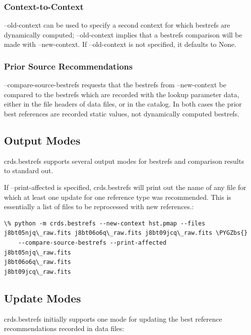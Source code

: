 \documentclass[letterpaper,10pt,english]{sphinxmanual}
\def\PYGZbs{\char`\\}
\begin{document}
\subsubsection{Context-to-Context}
\label{command_line_tools:context-to-context}
--old-context can be used to specify a second context for which bestrefs are dynamically computed; --old-context
implies that a bestrefs comparison will be made with --new-context.   If --old-context is not specified,  it
defaults to None.


\subsubsection{Prior Source Recommendations}
\label{command_line_tools:prior-source-recommendations}
--compare-source-bestrefs requests that the bestrefs from --new-context be compared to the bestrefs which are
recorded with the lookup parameter data,  either in the file headers of data files,  or in the catalog.   In both
cases the prior best references are recorded static values,  not dynamically computed bestrefs.


\subsection{Output Modes}
\label{command_line_tools:output-modes}
crds.bestrefs supports several output modes for bestrefs and comparison results to standard out.

If --print-affected is specified,  crds.bestrefs will print out the name of any file for which at least one update for
one reference type was recommended.   This is essentially a list of files to be reprocessed with new references.:

\begin{Verbatim}[commandchars=\\\{\}]
\% python -m crds.bestrefs --new-context hst.pmap --files j8bt05njq\_raw.fits j8bt06o6q\_raw.fits j8bt09jcq\_raw.fits \PYGZbs{}
    --compare-source-bestrefs --print-affected
j8bt05njq\_raw.fits
j8bt06o6q\_raw.fits
j8bt09jcq\_raw.fits
\end{Verbatim}


\subsection{Update Modes}
\label{command_line_tools:update-modes}
crds.bestrefs initially supports one mode for updating the best reference recommendations recorded in data files:
\end{document}
